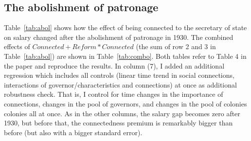 \documentclass[a4paper]{article}\usepackage[]{graphicx}\usepackage[]{xcolor}
\begin{document}
\subsection{The abolishment of patronage}
\hspace*{5mm} Table~\ref{tab:abol} shows how the effect of being connected to the secretary of state on salary changed after the abolishment of patronage in 1930. The combined effects of $Connected + Reform*Connected$ (the sum of row 2 and 3 in Table~\ref{tab:abol}) are shown in Table~\ref{tab:combo}. Both tables refer to Table 4 in the paper and reproduce the results. In column (7), I added an additional regression which includes all controls (linear time trend in social connections, interactions of governor/characteristics and connections) at once as additional robustness check. That is, I control for time changes in the importance of connections, changes in the pool of governors, and changes in the pool of colonies colonies all at once. As in the other columns, the salary gap becomes zero after 1930, but before that, the connectedness premium is remarkably bigger than before (but also with a bigger standard error). 
\end{document}
